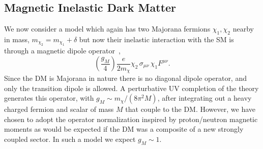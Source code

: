 \documentclass[11pt]{article}
\begin{document}
\subsection{Magnetic Inelastic Dark Matter}
\label{sec:MIDM}

We now consider a model which again has two Majorana fermions $\chi_1, \chi_2$ nearby in mass, $m_{\chi_2} = m_{\chi_1} + \delta$ but now their inelastic interaction with the SM is through a magnetic dipole operator~\cite{Chang:2010en, Kumar:2011iy,Weiner:2012cb, Weiner:2012gm},
\begin{equation}
\left( \frac {g_M}{4} \right) \frac{e}{2 m_{\chi}} \chi_2\, \sigma_{\mu\nu}\, \chi_1 F^{\mu\nu}.
\label{eq:magmoment}
\end{equation}
Since the DM is Majorana in nature there is no diagonal dipole operator, and only the transition dipole is allowed.  A perturbative UV completion \cite{Weiner:2012cb} of the theory generates this operator, with $g_M \sim m_\chi/(8\pi^2 M)$, after integrating out a heavy charged fermion and scalar of mass $M$ that couple to the DM.  However, we have chosen to adopt the operator normalization inspired by proton/neutron magnetic moments as would be expected if the DM was a composite of a new strongly coupled sector.  In such a model we expect $g_M\sim 1$. 
\end{document}
